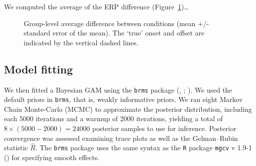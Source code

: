 \documentclass[
  doc,
  floatsintext,
  longtable,
  a4paper,
  nolmodern,
  notxfonts,
  notimes,
  colorlinks=true,linkcolor=blue,citecolor=blue,urlcolor=blue]{apa7}
\begin{document}
We computed the average of the ERP difference
(Figure~\ref{fig-erp})\ldots{}

\begin{figure}[!htb]

\caption{\label{fig-erp}Group-level average difference between
conditions (mean +/- standard error of the mean). The `true' onset and
offset are indicated by the vertical dashed lines.}


\end{figure}%

\subsection{Model fitting}\label{model-fitting}

We then fitted a Bayesian GAM using the \texttt{brms} package
(, ;
). We used the
default priors in \texttt{brms}, that is, weakly informative priors. We
ran eight Markov Chain Monte-Carlo (MCMC) to approximate the posterior
distribution, including each 5000 iterations and a warmup of 2000
iterations, yielding a total of \(8 \times (5000-2000) = 24000\)
posterior samples to use for inference. Posterior convergence was
assessed examining trace plots as well as the Gelman--Rubin statistic
\(\hat{R}\). The \texttt{brms} package uses the same syntax as the
\texttt{R} package \texttt{mgcv} v 1.9-1 () for specifying smooth effects.
\end{document}
